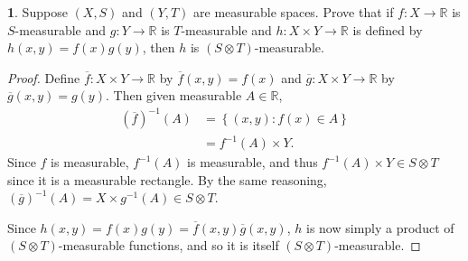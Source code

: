 \documentclass[12pt]{article}
\theoremstyle{definition}
\newtheorem{ex}{}
\newenvironment{exercise}[1]{
	\renewcommand{\theex}{#1}
	\begin{ex}
		}{\end{ex}}
\begin{document}
\begin{exercise}{5A.4}
	Suppose $(X, S)$ and $(Y, T)$ are measurable spaces.
	Prove that if $f : X \to \mathbb{R}$ is $S$-measurable and $g: Y \to \mathbb{R}$ is $T$-measurable and $h : X \times Y \to \mathbb{R}$ is defined by $h(x, y) = f(x)g(y)$, then $h$ is $(S \otimes T)$-measurable.
\end{exercise}
\begin{proof}
	Define $\overline{f} : X \times Y \to \mathbb{R}$ by $\overline{f}(x, y) = f(x)$ and $\overline{g} : X \times Y \to \mathbb{R}$ by $\overline{g}(x, y) = g(y)$.
	Then given measurable $A \in \mathbb{R}$, \begin{align*}
		\left(\overline{f}\right)^{-1}(A) & = \left\lbrace (x, y) : f(x) \in A \right\rbrace \\
		                                  & = f^{-1}(A) \times Y.
	\end{align*}
	Since $f$ is measurable, $f^{-1}(A)$ is measurable, and thus $f^{-1}(A) \times Y \in S \otimes T$ since it is a measurable rectangle.
	By the same reasoning, $\left(\overline{g}\right)^{-1}(A) = X \times g^{-1}(A) \in S \otimes T$.

	Since $h(x, y) = f(x)g(y) = \overline{f}(x, y)\overline{g}(x, y)$, $h$ is now simply a product of $(S \otimes T)$-measurable functions, and so it is itself $(S \otimes T)$-measurable.
\end{proof}
\end{document}
